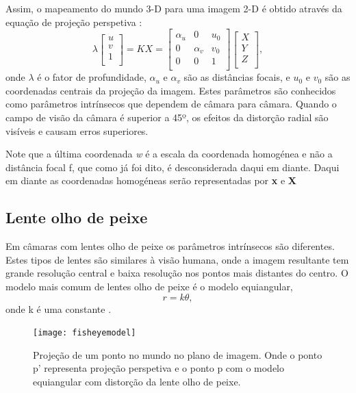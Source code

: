 Assim, o mapeamento do mundo 3-D para uma imagem 2-D é obtido através da equação de projeção perspetiva :
\[  \textbf{$\lambda$} \left[ \begin{array}{c} u\\v\\1\\ \end{array} \right] = 
KX = \left[ \begin{array}{ccc} \alpha_u  & 0 & \textit{u}_0 \\ 
0 & \alpha_v & \textit{v}_0 \\ 
0 & 0 & 1 \\
\end{array} \right] \left[ \begin{array}{c} X \\ 
Y \\ 
Z \\ 
\end{array} \right], \]
onde $\lambda$ é o fator de profundidade, $\alpha_u$ e $\alpha_v$ são as distâncias focais, e $\textit{u}_0$ e $\textit{v}_0$ são as coordenadas centrais da projeção da imagem. Estes parâmetros são conhecidos como parâmetros intrínsecos que dependem de câmara para câmara. Quando o campo de visão da câmara é superior a 45º, os efeitos da distorção radial são visíveis e causam erros superiores.

Note que a última coordenada \textit{w} é a escala da coordenada homogénea e não a distância focal f, que como já foi dito, é desconsiderada daqui em diante. Daqui em diante as coordenadas homogéneas serão representadas por \textbf{x} e \textbf{X} 


\subsection{Lente olho de peixe}

Em câmaras com lentes olho de peixe os parâmetros intrínsecos são diferentes. Estes tipos de lentes são similares à visão humana, onde a imagem resultante tem grande resolução central e baixa resolução nos pontos mais distantes do centro. O modelo mais comum de lentes olho de peixe é o modelo equiangular,  \[ r = k \theta,  \] onde k é uma constante \cite{Hansen2009}.

\begin{figure}[h!] %
	\begin{center}
		\leavevmode		
		\texttt{[image: fisheyemodel]}
		\caption{Projeção de um ponto no mundo no plano de imagem. Onde o ponto p' representa projeção perspetiva e o ponto p com o modelo equiangular com distorção da lente olho de peixe. \cite{Srestasathiern2014,Kannala2004}}
		\label{fig:fishvspinhole} 
	\end{center}
\end{figure}

